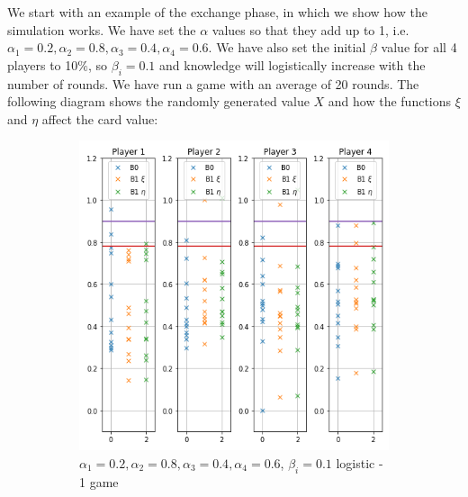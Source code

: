 We start with an example of the exchange phase, in which we show how the simulation works. We have set the $\alpha$ values so that they add up to 1, i.e. $\alpha_1=0.2,\alpha_2=0.8,\alpha_3=0.4,\alpha_4=0.6$. We have also set the initial $\beta$ value for all 4 players to 10$\%$, so $\beta_i=0.1$ and knowledge will logistically increase with the number of rounds. We have run a game with an average of 20 rounds. The following diagram shows the randomly generated value $X$ and how the functions $\xi$ and $\eta$ affect the card value:

\begin{figure}[ht]
\begin{subfigure}{0.5\textwidth}
    \centering
    \includegraphics[width=1\linewidth]{Bilder/example_1}
    \caption{$\alpha_1=0.2,\alpha_2=0.8,\alpha_3=0.4,\alpha_4=0.6$, $\beta_i=0.1$ logistic - 1 game}
    \label{fig:17}
\end{subfigure}
\begin{subfigure}{0.5\textwidth}
    \centering

\end{subfigure}
\end{figure}
